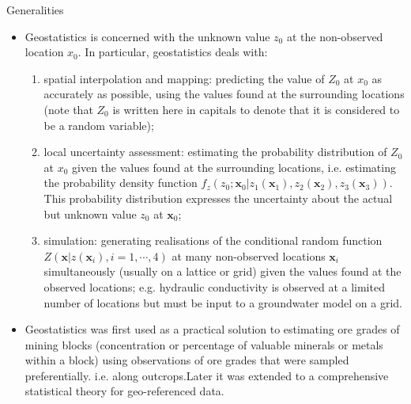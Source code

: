 \documentclass[8pt]{beamer}
\renewcommand{\emph}[1]{\textcolor{myorange}{#1}}
\begin{document}
\begin{frame}{Generalities}
    \begin{itemize}
        \item \emph{Geostatistics} is concerned with the unknown value $z_0$ at the non-observed location $x_0$. In particular, \emph{geostatistics} deals with:
            \begin{enumerate}
                \item \emph{spatial interpolation and mapping}: predicting the value of $Z_0$ at $x_0$ as accurately as possible, using the values found at the surrounding locations (note that $Z_0$ is written here in capitals to denote that it is considered to be a \emph{random variable});
                \item \emph{local uncertainty assessment}: estimating the probability distribution of $Z_0$ at $x_0$ given the values found at the surrounding locations, i.e. estimating the \emph{probability density function} $f_z \left(z_0;\mathbf{x}_0 | z_1(\mathbf{x}_1), z_2(\mathbf{x}_2), z_3(\mathbf{x}_3)\right)$. This probability distribution expresses the uncertainty about the actual but unknown value $z_0$ at $\mathbf{x}_0$;
                \item \emph{simulation}: generating realisations of the \emph{conditional random function} $Z(\mathbf{x} | z(\mathbf{x}_i ), i=1,\cdots,4)$ at many non-observed locations $\mathbf{x}_i$ simultaneously (usually on a \emph{lattice} or \emph{grid}) given the values found at the observed locations; e.g. \emph{hydraulic conductivity} is observed at a limited number of locations but must be input to a groundwater model on a grid.
            \end{enumerate}
        \item \emph{Geostatistics} was first used as a practical solution to estimating ore grades of mining blocks (concentration or percentage of valuable minerals or metals within a block) using observations of ore grades that were sampled preferentially. i.e. along outcrops.Later it was extended to a comprehensive statistical theory for \emph{geo-referenced data}.
    \end{itemize}
\end{frame}
 
\end{document}
